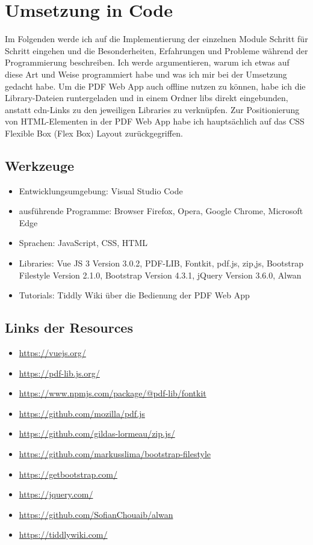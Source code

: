 \section{Umsetzung in Code}
Im Folgenden werde ich auf die Implementierung der einzelnen Module Schritt für Schritt eingehen und die Besonderheiten, Erfahrungen und Probleme während der Programmierung beschreiben. Ich werde argumentieren, warum ich etwas auf diese Art und Weise programmiert habe und was ich mir bei der Umsetzung gedacht habe. Um die PDF Web App auch offline nutzen zu können, habe ich die Library-Dateien runtergeladen und in einem Ordner libs direkt eingebunden, anstatt \gls{cdn}-Links zu den jeweiligen Libraries zu verknüpfen. Zur Positionierung von HTML-Elementen in der PDF Web App habe ich hauptsächlich auf das CSS Flexible Box (Flex Box) Layout zurückgegriffen. 

\subsection{Werkzeuge}
\begin{itemize}
	\item Entwicklungsumgebung: Visual Studio Code
	\item ausführende Programme: Browser Firefox, Opera, Google Chrome, Microsoft Edge
	\item Sprachen: JavaScript, CSS, HTML
	\item Libraries: Vue JS 3 Version 3.0.2, PDF-LIB, Fontkit, pdf.js, zip,js, Bootstrap Filestyle Version 2.1.0, Bootstrap Version 4.3.1, jQuery Version 3.6.0, Alwan
	\item Tutorials: Tiddly Wiki über die Bedienung der PDF Web App
\end{itemize}

\subsection{Links der Resources}
\begin{itemize}
	\item \url{https://vuejs.org/}
	\item \url{https://pdf-lib.js.org/}
	\item \url{https://www.npmjs.com/package/@pdf-lib/fontkit}
	\item \url{https://github.com/mozilla/pdf.js}
	\item \url{https://github.com/gildas-lormeau/zip.js/}
	\item \url{https://github.com/markusslima/bootstrap-filestyle}
	\item \url{https://getbootstrap.com/}
	\item \url{https://jquery.com/}
	\item \url{https://github.com/SofianChouaib/alwan}
	\item \url{https://tiddlywiki.com/}
\end{itemize}

